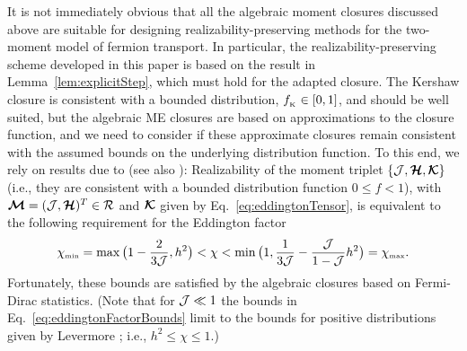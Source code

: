 It is not immediately obvious that all the algebraic moment closures discussed above are suitable for designing realizability-preserving methods for the two-moment model of fermion transport.  
In particular, the realizability-preserving scheme developed in this paper is based on the result in Lemma~\ref{lem:explicitStep}, which must hold for the adapted closure.  
The Kershaw closure is consistent with a bounded distribution, $f_{_{\mbox{\tiny K}}}\in[0,1]$, and should be well suited, but the algebraic ME closures are based on approximations to the closure function, and we need to consider if these approximate closures remain consistent with the assumed bounds on the underlying distribution function.  
To this end, we rely on results due to \cite{levermore_1984,lareckiBanach_2011} (see also \cite{kershaw_1976,shohatTamarkin_1943}):  Realizability of the moment triplet $\{\mathcal{J},\boldsymbol{\mathcal{H}},\boldsymbol{\mathcal{K}}\}$ (i.e., they are consistent with a bounded distribution function $0 \le f<1$), with $\boldsymbol{\mathcal{M}}=(\mathcal{J},\boldsymbol{\mathcal{H}})^{T}\in\mathcal{R}$ and $\boldsymbol{\mathcal{K}}$ given by Eq.~\eqref{eq:eddingtonTensor}, is equivalent to the following requirement for the Eddington factor
\begin{equation}
  \chi_{\mbox{\tiny min}}
  =\max\big(1-\frac{2}{3\mathcal{J}},h^{2}\big)
  <\chi<\min\big(1,\frac{1}{3\mathcal{J}}-\frac{\mathcal{J}}{1-\mathcal{J}}h^{2}\big)=\chi_{\mbox{\tiny max}}.  
  \label{eq:eddingtonFactorBounds}
\end{equation}
Fortunately, these bounds are satisfied by the algebraic closures based on Fermi-Dirac statistics.  
(Note that for $\mathcal{J}\ll1$ the bounds in Eq.~\eqref{eq:eddingtonFactorBounds} limit to the bounds for positive distributions given by Levermore \cite{levermore_1984}; i.e., $h^{2}\le\chi\le1.$)


